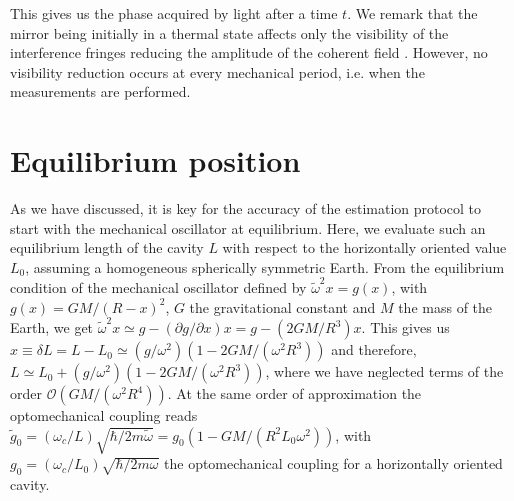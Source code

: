 \documentclass[aps,twocolumn,preprintnumbers,amsmath,amssymb]{revtex4}
\begin{document}
This gives us the phase acquired by light after a time $t$. We remark that the mirror being initially in a thermal state affects only the visibility of the interference fringes reducing the amplitude of the coherent field \cite{armata2016}. However, no visibility reduction occurs at every mechanical period, i.e. when the measurements are performed.

\noindent
\section{\label{Equilibrium position} Equilibrium position}
As we have discussed, it is key for the accuracy of the estimation protocol to start with the mechanical oscillator at equilibrium. Here, we evaluate such an equilibrium length of the cavity $L$ with respect to the horizontally oriented value $L_0$, assuming a homogeneous spherically symmetric Earth. From the equilibrium condition of the mechanical oscillator defined by $\tilde{\omega}^2x=g(x)$, with $g(x)=GM/(R-x)^2$, $G$ the gravitational constant and $M$ the mass of the Earth, we get $\tilde{\omega}^2x\simeq g-(\partial g/\partial x)x=g-(2GM/R^3)x$. This gives us $x\equiv\delta L=L-L_0\simeq (g/\omega^2)(1-2GM/(\omega^2R^3))$ and therefore, $L\simeq L_0+(g/\omega^2)(1-2GM/(\omega^2R^3))$, where we have neglected terms of the order $\mathcal{O}(GM/(\omega^2R^4))$. At the same order of approximation the optomechanical coupling reads $\tilde{g}_0=(\omega_c/L)\sqrt{\hbar/2m\tilde{\omega}}=g_0(1-GM/(R^2L_0\omega^2))$, with $g_0=(\omega_c/L_0)\sqrt{\hbar/2m\omega}$ the optomechanical coupling for a horizontally oriented cavity.\\

%

\end{document}
